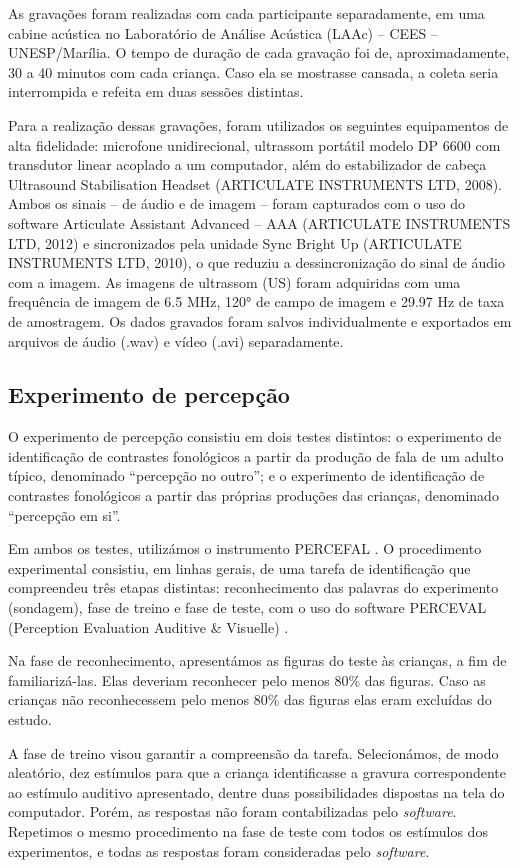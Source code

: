 \documentclass[output=paper,colorlinks,citecolor=brown,booklanguage=portuguese]{langscibook}
\begin{document}
As gravações foram realizadas com cada participante separadamente, em uma cabine acústica no Laboratório de Análise Acústica (LAAc) – CEES – UNESP/Marília. O tempo de duração de cada gravação foi de, aproximadamente, 30 a 40 minutos com cada criança. Caso ela se mostrasse cansada, a coleta seria interrompida e refeita em duas sessões distintas.

Para a realização dessas gravações, foram utilizados os seguintes equipamentos de alta fidelidade: microfone unidirecional, ultrassom portátil modelo DP 6600 com transdutor linear acoplado a um computador, além do estabilizador de cabeça Ultrasound Stabilisation Headset (ARTICULATE INSTRUMENTS LTD, 2008). Ambos os sinais – de áudio e de imagem – foram capturados com o uso do software Articulate Assistant Advanced – AAA (ARTICULATE INSTRUMENTS LTD, 2012) e sincronizados pela unidade Sync Bright Up (ARTICULATE INSTRUMENTS LTD, 2010), o que reduziu a dessincronização do sinal de áudio com a imagem. As imagens de ultrassom (US) foram adquiridas com uma frequência de imagem de 6.5 MHz, 120° de campo de imagem e 29.97 Hz de taxa de amostragem. Os dados gravados foram salvos individualmente e exportados em arquivos de áudio (.wav) e vídeo (.avi) separadamente.

\subsection{Experimento de percepção}
O experimento de percepção consistiu em dois testes distintos: o experimento de identificação de contrastes fonológicos a partir da produção de fala de um adulto típico, denominado “percepção no outro”; e o experimento de identificação de contrastes fonológicos a partir das próprias produções das crianças, denominado “percepção em si”.

Em ambos os testes, utilizámos o instrumento PERCEFAL \citep{Berti2017}. O procedimento experimental consistiu, em linhas gerais, de uma tarefa de identificação que compreendeu três etapas distintas: reconhecimento das palavras do experimento (sondagem), fase de treino e fase de teste, com o uso do software PERCEVAL (Perception Evaluation Auditive \& Visuelle) \citep{Andre2009}.

Na fase de reconhecimento, apresentámos as figuras do teste às crianças, a fim de familiarizá-las. Elas deveriam reconhecer pelo menos 80\% das figuras. Caso as crianças não reconhecessem pelo menos 80\% das figuras elas eram excluídas do estudo.

A fase de treino visou garantir a compreensão da tarefa. Selecionámos, de modo aleatório, dez estímulos para que a criança identificasse a gravura correspondente ao estímulo auditivo apresentado, dentre duas possibilidades dispostas na tela do computador. Porém, as respostas não foram contabilizadas pelo \emph{software}. Repetimos o mesmo procedimento na fase de teste com todos os estímulos dos experimentos, e todas as respostas foram consideradas pelo \emph{software}.
\end{document}
